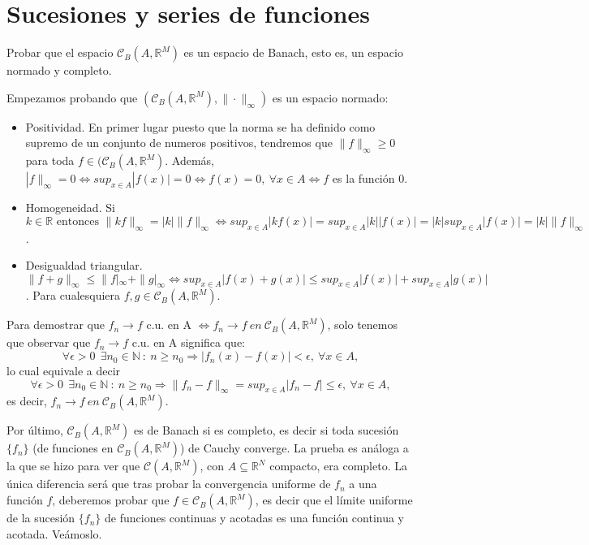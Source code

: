 
\section{Sucesiones y series de funciones}

\begin{ejer}
  Probar que el espacio $\mathcal{C}_B(A,\mathbb{R}^M)$ es un espacio de Banach, esto es, un espacio normado y completo.
\end{ejer}

  \begin{sol}
    Empezamos probando que $(\mathcal{C}_B(A, \mathbb R^M), \|\cdot \|_\infty)$ es un espacio normado:
    \begin{itemize}

    \item  Positividad. En primer lugar puesto que la norma se ha definido como supremo de un conjunto de numeros positivos, tendremos que $\|f\|_\infty \geq 0$ para toda $f\in (\mathcal{C}_B(A, \mathbb R^M)$. Además, $|f\|_\infty=0 \iff sup_{x \in A}|f(x)|=0 \iff f(x)=0, \ \forall x \in A \iff f$ es la función 0.
    \item Homogeneidad. Si $k \in \mathbb R \text{ entonces } \|kf\|_\infty=|k|\|f\|_\infty \iff sup_{x \in A}|kf(x)|=sup_{x \in A}|k||f(x)|=|k|sup_{x \in A}|f(x)| = |k| \| f\|_\infty$.
    \item Desigualdad triangular.
      $\|f+g\|_\infty \leq \|f|_\infty + \|g|_\infty\iff sup_{x \in A}|f(x)+g(x)| \leq sup_{x \in A}|f(x)| + sup_{x \in A}|g(x)|$.
      Para cualesquiera $f, g \in \mathcal{C}_B(A, \mathbb R^M)$.
    \end{itemize}

    Para demostrar que ${f_n} \to f$  c.u. en A $\iff f_n \to f\ en\ \mathcal{C}_B(A, \mathbb R^M)$, solo tenemos que observar que ${f_n} \to f$  c.u. en A  significa que: $$\forall \epsilon>0 \ \ \exists n_0\in \mathbb N \ :\ n\geq n_0 \Rightarrow |f_n(x)-f(x) |<\epsilon , \ \forall x\in A,$$
    lo cual equivale a decir $$\forall \epsilon>0 \ \ \exists n_0\in \mathbb N \ :\ n\geq n_0 \Rightarrow \|f_n-f\|_\infty = sup_{x \in A} |f_n-f| \leq \epsilon , \ \forall x\in A,$$
    es decir, $f_n \to f\ en\ \mathcal{C}_B(A, \mathbb R^M)$.

    Por último, $\mathcal{C}_B(A, \mathbb R^M)$ es de Banach si es completo, es decir si toda sucesión $\{ f_n\}$ (de funciones en $\mathcal{C}_B(A, \mathbb R^M)$) de Cauchy converge. La prueba es análoga a la que se hizo para ver que $\mathcal{C}(A,\mathbb{R}^M)$, con $A \subseteq \mathbb{R}^N$ compacto, era completo. La única diferencia será que tras probar la convergencia uniforme de $f_n$ a una función  $f$, deberemos probar que $f\in \mathcal{C}_B(A,\mathbb{R}^M)$, es decir que el límite uniforme de la sucesión $\{f_n\}$ de funciones continuas y acotadas es una función continua y acotada. Veámoslo.


\end{sol}

